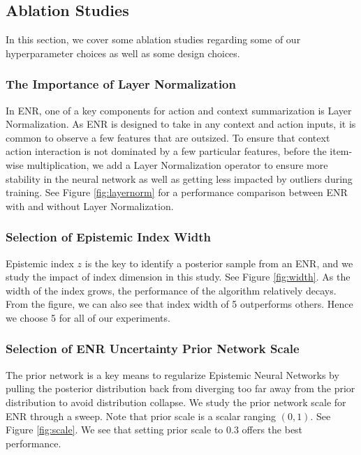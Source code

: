 \subsection{Ablation Studies}
In this section, we cover some ablation studies regarding some of our hyperparameter choices as well as some design choices.
\vspace{-0.05in}
\subsubsection{The Importance of Layer Normalization}
In ENR, one of a key components for action and context summarization is Layer Normalization. As ENR is designed to take in any context and action inputs, it is common to observe a few features that are outsized. To ensure that context action interaction is not dominated by a few particular features, before the item-wise multiplication, we add a Layer Normalization operator to ensure more stability in the neural network as well as getting less impacted by outliers during training. See Figure \ref{fig:layernorm} for a performance comparison between ENR with and without Layer Normalization.
\vspace{-0.05in}
\subsubsection{Selection of Epistemic Index Width}
Epistemic index $z$ is the key to identify a posterior sample from an ENR, and we study the impact of index dimension in this study. See Figure \ref{fig:width}. As the width of the index grows, the performance of the algorithm relatively decays. From the figure, we can also see that index width of 5 outperforms others. Hence we choose 5 for all of our experiments.
\vspace{-0.05in}
\subsubsection{Selection of ENR Uncertainty Prior Network Scale} 
The prior network is a key means to regularize Epistemic Neural Networks by pulling the posterior distribution back from diverging too far away from the prior distribution to avoid distribution collapse. We study the prior network scale for ENR through a sweep. Note that prior scale is a scalar ranging $(0, 1)$. See Figure \ref{fig:scale}. We see that setting prior scale to 0.3 offers the best performance.
